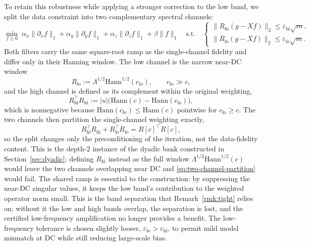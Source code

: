 \documentclass{article}
\begin{document}
To retain this robustness while applying a stronger correction to the low band, we split the data constraint into two complementary spectral channels:
\begin{equation}
\label{eq:two}
\min_{f\ge 0}\;
\alpha_x\|\partial_x f\|_1+\alpha_y\|\partial_y f\|_1+\alpha_z\|\partial_z f\|_1+\beta\|f\|_1
\quad\text{s.t.}\quad
\begin{cases}
\|R_{\mathrm{hi}}(g-Xf)\|_2\le\varepsilon_{\mathrm{hi}}\sqrt{m},\\[0.25em]
\|R_{\mathrm{lo}}(g-Xf)\|_2\le\varepsilon_{\mathrm{lo}}\sqrt{m}.
\end{cases}
\end{equation}
Both filters carry the same square-root ramp as the single-channel fidelity and differ only in their Hanning window. The low channel is the narrow near-DC window
\begin{equation}
\label{eq:Rlo}
R_{\mathrm{lo}}:=\Lambda^{1/2}\mathrm{Hann}^{1/2}(c_{\mathrm{lo}}),
\qquad c_{\mathrm{lo}}\gg c,
\end{equation}
and the high channel is defined as its complement within the original weighting,
\begin{equation}
\label{eq:Rhi}
R_{\mathrm{hi}}^\top R_{\mathrm{hi}}
:=|u|\big(\mathrm{Hann}(c)-\mathrm{Hann}(c_{\mathrm{lo}})\big),
\end{equation}
which is nonnegative because $\mathrm{Hann}(c_{\mathrm{lo}})\le\mathrm{Hann}(c)$ pointwise for $c_{\mathrm{lo}}\ge c$. The two channels then partition the single-channel weighting exactly,
\begin{equation}
\label{eq:two-channel-partition}
R_{\mathrm{hi}}^\top R_{\mathrm{hi}}+R_{\mathrm{lo}}^\top R_{\mathrm{lo}}=R[c]^\top R[c],
\end{equation}
so the split changes only the preconditioning of the iteration, not the data-fidelity content. This is the depth-$2$ instance of the dyadic bank constructed in Section~\ref{sec:dyadic}; defining $R_{\mathrm{hi}}$ instead as the full window $\Lambda^{1/2}\mathrm{Hann}^{1/2}(c)$ would leave the two channels overlapping near DC and \eqref{eq:two-channel-partition} would fail. The shared ramp is essential to the construction: by suppressing the near-DC singular values, it keeps the low band's contribution to the weighted operator norm small. This is the band separation that Remark~\ref{rmk:tight} relies on; without it the low and high bands overlap, the separation is lost, and the certified low-frequency amplification no longer provides a benefit. The low-frequency tolerance is chosen slightly looser, $\varepsilon_{\mathrm{lo}}>\varepsilon_{\mathrm{hi}}$, to permit mild model mismatch at DC while still reducing large-scale bias.
\end{document}
